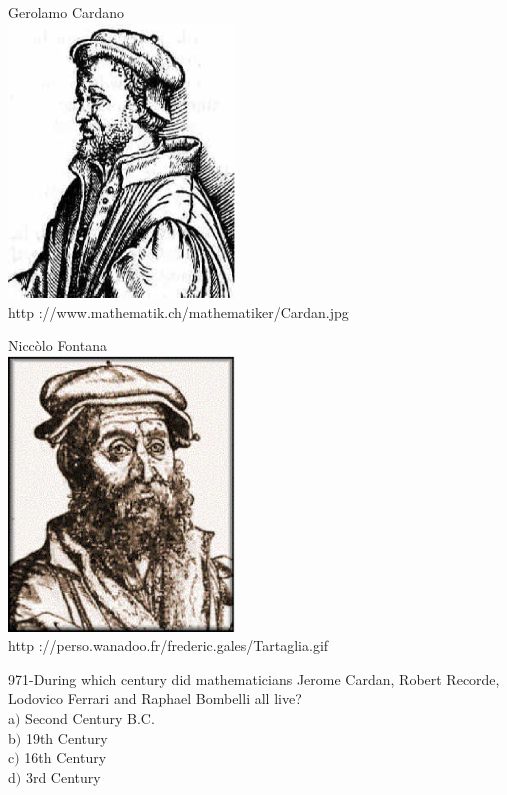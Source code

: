 \documentclass[letterpaper, 12pt]{article}
\begin{document}
        \begin{center}
        Gerolamo Cardano\\
    \includegraphics[width=6cm]{Cardan.eps}\\
        {\footnotesize http ://www.mathematik.ch/mathematiker/Cardan.jpg}
    \end{center}

        \begin{center}
        Nicc\`olo Fontana\\
    \includegraphics[width=6cm]{Tartaglia.eps}\\
        {\footnotesize http
://perso.wanadoo.fr/frederic.gales/Tartaglia.gif}
    \end{center}

971-During which century did mathematicians Jerome Cardan, Robert Recorde, Lodovico Ferrari and Raphael Bombelli all live?\\

a$)$ Second Century B.C.\\
b$)$ 19th Century \\
c$)$ 16th Century  \\
d$)$ 3rd Century \\
\end{document}
